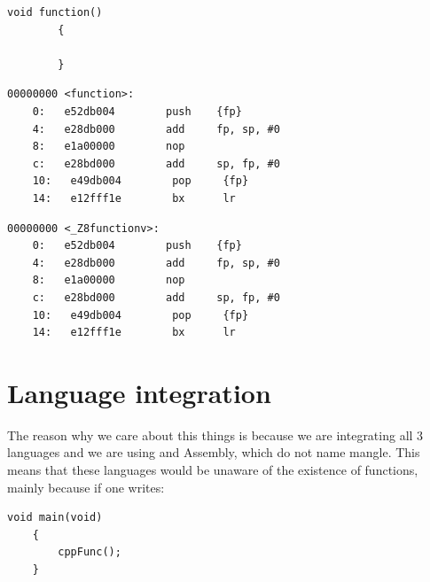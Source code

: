 \documentclass[12pt, svgnames]{book}
\begin{document}
\centering
\begin{minipage}{0.45\textwidth}
	\begin{lstlisting}[style=c, title= Source]
		void function()
		{
		
		}
	\end{lstlisting}
\end{minipage}

\begin{minipage}{0.45\textwidth}
	\begin{lstlisting}[style=bash, title= \notengl{gcc}]
	00000000 <function>:
	0:   e52db004        push    {fp}           
	4:   e28db000        add     fp, sp, #0
	8:   e1a00000        nop                     
	c:   e28bd000        add     sp, fp, #0
	10:   e49db004        pop     {fp}            
	14:   e12fff1e        bx      lr
	\end{lstlisting}
\end{minipage}
\begin{minipage}{0.45\textwidth}
	\begin{lstlisting}[style=bash, title= \notengl{g++}]
	00000000 <_Z8functionv>:
	0:   e52db004        push    {fp}            
	4:   e28db000        add     fp, sp, #0
	8:   e1a00000        nop                    
	c:   e28bd000        add     sp, fp, #0
	10:   e49db004        pop     {fp}           
	14:   e12fff1e        bx      lr
	\end{lstlisting}
\end{minipage}

\section{Language integration}

\flushleft
The reason why we care about this things is because we are integrating all 3 languages and we are using  and Assembly, which do not name mangle. This means that these languages would be unaware of the existence of  functions, mainly because if one writes:

\begin{lstlisting}[style=C]
	void main(void)
	{
		cppFunc();
	}
\end{lstlisting}
\end{document}
